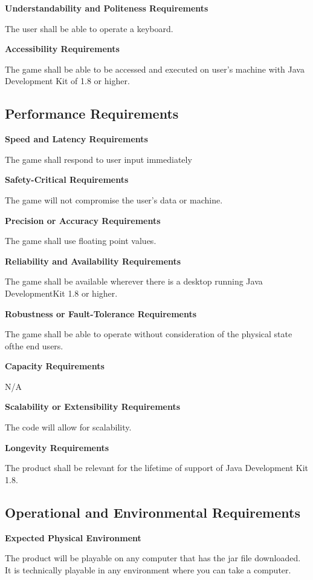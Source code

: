 \documentclass[12pt, titlepage]{article}
\begin{document}
\noindent \textbf{Understandability and Politeness Requirements}

The user shall be able to operate a keyboard.

\noindent \textbf{Accessibility Requirements}

The game shall be able to be accessed and executed on user’s machine with Java
Development Kit of 1.8 or higher.

\subsection{Performance Requirements}
\textbf{Speed and Latency Requirements}

The game shall respond to user input immediately

\noindent \textbf{Safety-Critical Requirements}

The game will not compromise the user’s data or machine. 

\noindent \textbf{Precision or Accuracy Requirements}

The game shall use floating point values. 

\noindent \textbf{Reliability and Availability Requirements}

The game shall be available wherever there is a desktop running Java
DevelopmentKit 1.8 or higher.

\noindent \textbf{Robustness or Fault-Tolerance Requirements}

The game shall be able to operate without consideration of the physical state
ofthe end users.

\noindent \textbf{Capacity Requirements}

N/A

\noindent \textbf{Scalability or Extensibility Requirements}

The code will allow for scalability.

\noindent \textbf{Longevity Requirements}

The product shall be relevant for the lifetime of support of Java Development
Kit 1.8.


\subsection{Operational and Environmental Requirements}
\textbf{Expected Physical Environment}

The product will be playable on any computer that has the jar file downloaded.
It is technically playable in any environment where you can take a computer.
 
\end{document}
